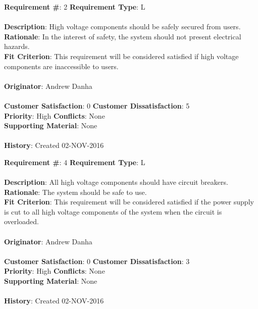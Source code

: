 \documentclass[titlepage]{article}
\begin{document}
\begin{framed}
	\noindent\textbf{Requirement \#}: 2 \hfill \textbf{Requirement Type}: L \hfill\\\\
	\noindent\textbf{Description}: High voltage components should be safely secured from users.\\
	\textbf{Rationale}: In the interest of safety, the system should not present electrical hazards.\\
	\textbf{Fit Criterion}: This requirement will be considered satisfied if high voltage components are inaccessible to users.\\\\
	\textbf{Originator}: Andrew Danha\\\\
	\noindent\textbf{Customer Satisfaction}: 0 \hfill 	\textbf{Customer Dissatisfaction}: 5 \hfill\\
	\textbf{Priority}: High \hfill \textbf{Conflicts}: None \hfill\\
	\textbf{Supporting Material}: None\\\\
	\noindent\textbf{History}: Created 02-NOV-2016
\end{framed}

\begin{framed}
	\noindent\textbf{Requirement \#}: 4 \hfill \textbf{Requirement Type}: L \hfill\\\\
	\noindent\textbf{Description}: All high voltage components should have circuit breakers.\\
	\textbf{Rationale}: The system should be safe to use.\\
	\textbf{Fit Criterion}: This requirement will be considered satisfied if the power supply is cut to all high voltage components of the system when the circuit is overloaded.\\\\
	\textbf{Originator}: Andrew Danha\\\\
	\noindent\textbf{Customer Satisfaction}: 0 \hfill 	\textbf{Customer Dissatisfaction}: 3 \hfill\\
	\textbf{Priority}: High \hfill \textbf{Conflicts}: None \hfill\\
	\textbf{Supporting Material}: None\\\\
	\noindent\textbf{History}: Created 02-NOV-2016
\end{framed}
\end{document}
